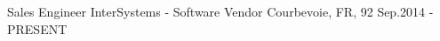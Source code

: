 

\begin{cventries}

  \cventry
    {Sales Engineer} %
    {InterSystems - Software Vendor} %
    {Courbevoie, FR, 92} %
    {Sep.2014 - PRESENT} %
    {
      \begin{cvitems} %
        \item {}
      \end{cvitems}
    }


\end{cventries}
